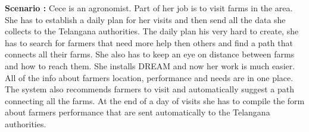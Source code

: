 \begin{flushleft}
\textbf{Scenario :} 
Cece is an agronomist. Part of her job is to visit farms in the area. She has to establish a daily plan for her visits and then send all the data she collects to the Telangana authorities. The daily plan his very hard to create, she has to search for farmers that need more help then others and find a path that connects all their farms. She also has to keep an eye on distance between farms and how to reach them. She installs DREAM and now her work is much easier. All of the info about farmers location, performance and needs are in one place. The system also recommends farmers to visit and automatically suggest a path connecting all the farms. At the end of a day of visits she has to compile the form about farmers performance that are sent automatically to the Telangana authorities.
\end{flushleft}